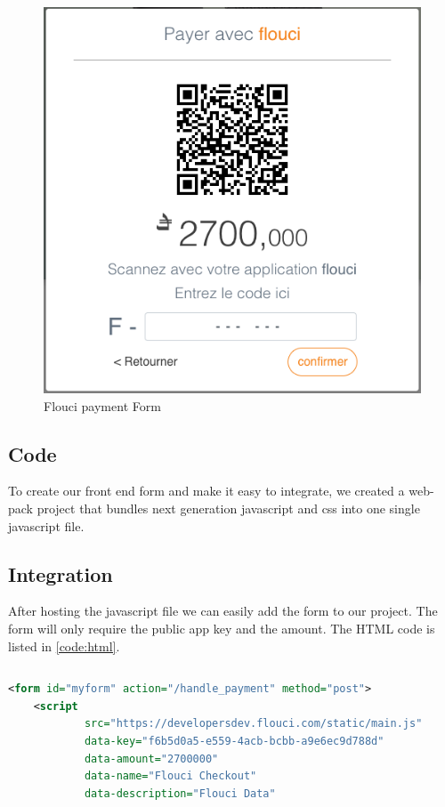 \begin{spacing}{1.2}
\begin{figure}[H]\centering
\includegraphics[scale=0.5]{payment_form.png}
\caption{Flouci payment Form}
\label{fig:register}
\end{figure}

\subsection{Code}
To create our front end form and make it easy to integrate, we created a web-pack project that bundles next generation javascript and css into one single javascript file.

\subsection{Integration}
After hosting the javascript file we can easily add the form to our project. The form will only require the public app key  and the amount.
The HTML code is listed in \ref{code:html}.
\begin{lstlisting}[rulecolor=\color{white}]
\end{lstlisting}
\begin{lstlisting}[label=code:html,caption=Flouci Integration Java,language=xml]
 <form id="myform" action="/handle_payment" method="post">
    <script
            src="https://developersdev.flouci.com/static/main.js"
            data-key="f6b5d0a5-e559-4acb-bcbb-a9e6ec9d788d"
            data-amount="2700000"
            data-name="Flouci Checkout"
            data-description="Flouci Data"


\end{lstlisting}
\end{spacing}
